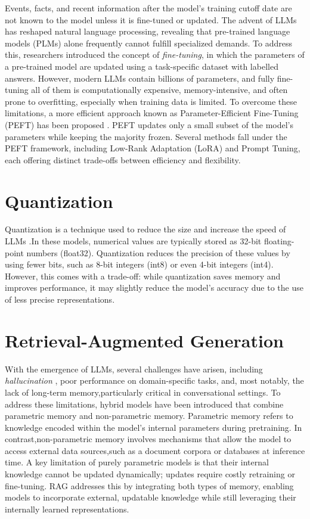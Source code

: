 \documentclass[%
    paper=A4,                    %
    twoside=true,               %
    openright,                  %
    parskip=full,               %
    chapterprefix=true,         %
    11pt,                       %
    headings=normal,            %
    bibliography=totoc,         %
    listof=totoc,              %
    titlepage=on,              %
    captions=tableabove,        %
    draft=false,               %
]{scrreprt}%
\begin{document}
Events, facts, and recent information after the model's training cutoff date are not known to the model unless it is fine-tuned or updated.  
The advent of LLMs has reshaped natural language processing, revealing that pre-trained language models (PLMs) \cite{devlin2019bert} alone frequently cannot fulfill specialized demands. To address this, researchers \cite{howard2018universal} introduced the concept of \textit{fine-tuning}, in which the parameters of a pre-trained model are updated using a task-specific dataset with labelled answers.
However, modern LLMs contain billions of parameters, and fully fine-tuning all of them is computationally expensive, memory-intensive, and often prone to overfitting, especially when training data is limited. To overcome these limitations, a more efficient approach known as Parameter-Efficient Fine-Tuning (PEFT) has been proposed \cite{xu2023parameter}.
PEFT updates only a small subset of the model's parameters while keeping the majority frozen. Several methods fall under the PEFT framework, including Low-Rank Adaptation (LoRA) \cite{hu2022lora} and Prompt Tuning, each offering distinct trade-offs between efficiency and flexibility.


\section{Quantization}

Quantization is a technique used to reduce the size and increase the speed of LLMs \cite{wu2020integer}.In these models, numerical values are typically stored as 32-bit floating-point numbers (float32). Quantization reduces the precision of these values by using fewer bits, such as 8-bit integers (int8) or even 4-bit integers (int4). However, this comes with a trade-off: while quantization saves memory and improves performance, it may slightly reduce the model's accuracy due to the use of less precise representations.


\section{Retrieval-Augmented Generation }

With the emergence of LLMs, several challenges have arisen, including \textit{hallucination} \cite{marcus2020next}, poor performance on domain-specific tasks, and, most notably, the lack of long-term memory,particularly critical in conversational settings. To address these limitations, hybrid models \cite{guu2020retrieval} have been introduced that combine parametric memory and non-parametric memory.
Parametric memory refers to knowledge encoded within the model’s internal parameters during pretraining. In contrast,non-parametric memory involves mechanisms that allow the model to access external data sources,such as  a document corpora or databases at inference time. A key limitation of purely parametric models is that their internal knowledge cannot be updated dynamically; updates require costly retraining or fine-tuning. RAG \cite{lewis2020retrieval} addresses this by integrating both types of memory, enabling models to incorporate external, updatable knowledge while still leveraging their internally learned representations.
\end{document}
